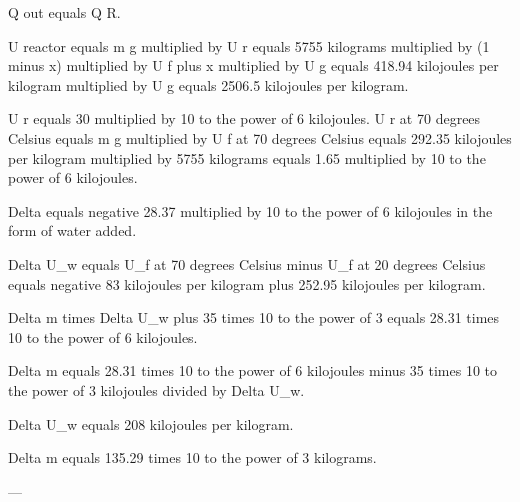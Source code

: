 Q out equals Q R.  

U reactor equals m g multiplied by U r equals 5755 kilograms multiplied by (1 minus x) multiplied by U f plus x multiplied by U g equals 418.94 kilojoules per kilogram multiplied by U g equals 2506.5 kilojoules per kilogram.  

U r equals 30 multiplied by 10 to the power of 6 kilojoules.  
U r at 70 degrees Celsius equals m g multiplied by U f at 70 degrees Celsius equals 292.35 kilojoules per kilogram multiplied by 5755 kilograms equals 1.65 multiplied by 10 to the power of 6 kilojoules.  

Delta equals negative 28.37 multiplied by 10 to the power of 6 kilojoules in the form of water added.

Delta U_w equals U_f at 70 degrees Celsius minus U_f at 20 degrees Celsius equals negative 83 kilojoules per kilogram plus 252.95 kilojoules per kilogram.  

Delta m times Delta U_w plus 35 times 10 to the power of 3 equals 28.31 times 10 to the power of 6 kilojoules.  

Delta m equals 28.31 times 10 to the power of 6 kilojoules minus 35 times 10 to the power of 3 kilojoules divided by Delta U_w.  

Delta U_w equals 208 kilojoules per kilogram.  

Delta m equals 135.29 times 10 to the power of 3 kilograms.  

---